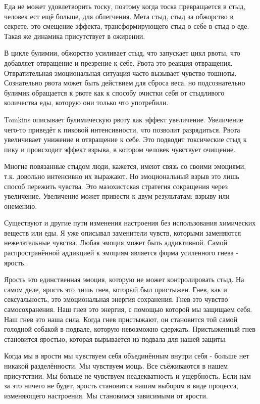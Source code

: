 \documentclass[10pt, fleqn]{article}
\begin{document}
Еда не может удовлетворить тоску, поэтому когда тоска превращается в стыд, человек ест ещё больше, для облегчения. Мета стыд, стыд за обжорство в секрете, это смещение эффекта, трансформирующего стыд о себе в стыд о еде. Такая же динамика присутствует в ожирении.

В цикле булимии, обжорство усиливает стыд, что запускает цикл рвоты, что добавляет отвращение и презрение к себе. Рвота это реакция отвращения. Отвратительная эмоциональная ситуация часто вызывает чувство тошноты. Сознательно рвота может быть действием для сброса веса, но подсознательно булимик обращается к рвоте как к способу очистки себя от стыдливого количества еды, которую они только что употребили.

Tomkins описывает булимическую рвоту как эффект увеличение. Увеличение чего-то приведёт к пиковой интенсивности, что позволит разрядиться. Рвота увеличивает унижение и отвращение к себе. Это подводит токсические стыд к пику и происходит эффект взрыва, в котором человек чувствует очищение.

Многие повязанные стыдом люди, кажется, имеют связь со своими эмоциями, т.к. довольно интенсивно их выражают. Но эмоциональный взрыв это лишь способ пережить чувства. Это мазохистская стратегия сокращения через увеличение. Увеличение может привести к двум результатам: взрыву или онемению.


Существуют и другие пути изменения настроения без использования химических веществ или еды. Я уже описывал заменители чувств, которыми заменяются нежелательные чувства. Любая эмоция может быть аддиктивной. Самой распространённой аддикцией к эмоциям является форма усиленного гнева - ярость.

Ярость это единственная эмоция, которую не может контролировать стыд. На самом деле, ярость это лишь гнев, который был пристыжен. Гнев, как и сексуальность, это эмоциональная энергия сохранения. Гнев это чувство самосохранения. Наш гнев это энергия, с помощью которой мы защищаем себя. Наш гнев это наша сила. Когда гнев пристыжают, он становится той самой голодной собакой в подвале, которую невозможно сдержать. Пристыженный гнев становится яростью, которая вырывается из подвала для нашей защиты.



Когда мы в ярости мы чувствуем себя объединённым внутри себя - больше нет никакой разделённости. Мы чувствуем мощь. Все съёживаются в нашем присутствии. Мы больше не чувствуем неадекватность и ущербность. Если нам за это ничего не будет, ярость становится нашим выбором в виде процесса, изменяющего настроения. Мы становимся зависимыми от ярости.
\end{document}
